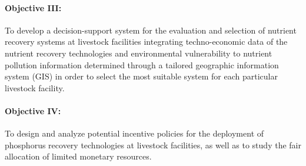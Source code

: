 \paragraph{Objective III:} To develop a decision-support system for the evaluation and selection of nutrient recovery systems at livestock facilities integrating techno-economic data of the nutrient recovery technologies and environmental vulnerability to nutrient pollution information determined through a tailored geographic information system (GIS) in order to select  the most suitable system for each particular livestock facility.
\paragraph{Objective IV:} To design and analyze potential incentive policies for the deployment of phosphorus recovery technologies at livestock facilities, as well as to study the fair allocation of limited monetary resources.

%
